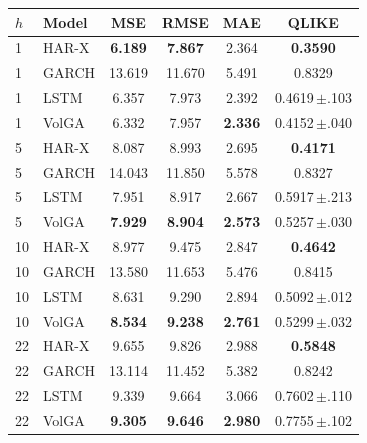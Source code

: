 \begin{tabular}{llcccc}
\toprule
$h$ & Model & MSE & RMSE & MAE & QLIKE \\
\midrule
1 & HAR-X & \textbf{6.189} & \textbf{7.867} & 2.364 & \textbf{0.3590} \\
1 & GARCH & 13.619 & 11.670 & 5.491 & 0.8329 \\
1 & LSTM & 6.357 & 7.973 & 2.392 & 0.4619\,$\pm$.103 \\
1 & VolGA & 6.332 & 7.957 & \textbf{2.336} & 0.4152\,$\pm$.040 \\
\midrule
5 & HAR-X & 8.087 & 8.993 & 2.695 & \textbf{0.4171} \\
5 & GARCH & 14.043 & 11.850 & 5.578 & 0.8327 \\
5 & LSTM & 7.951 & 8.917 & 2.667 & 0.5917\,$\pm$.213 \\
5 & VolGA & \textbf{7.929} & \textbf{8.904} & \textbf{2.573} & 0.5257\,$\pm$.030 \\
\midrule
10 & HAR-X & 8.977 & 9.475 & 2.847 & \textbf{0.4642} \\
10 & GARCH & 13.580 & 11.653 & 5.476 & 0.8415 \\
10 & LSTM & 8.631 & 9.290 & 2.894 & 0.5092\,$\pm$.012 \\
10 & VolGA & \textbf{8.534} & \textbf{9.238} & \textbf{2.761} & 0.5299\,$\pm$.032 \\
\midrule
22 & HAR-X & 9.655 & 9.826 & 2.988 & \textbf{0.5848} \\
22 & GARCH & 13.114 & 11.452 & 5.382 & 0.8242 \\
22 & LSTM & 9.339 & 9.664 & 3.066 & 0.7602\,$\pm$.110 \\
22 & VolGA & \textbf{9.305} & \textbf{9.646} & \textbf{2.980} & 0.7755\,$\pm$.102 \\
\bottomrule
\end{tabular}
